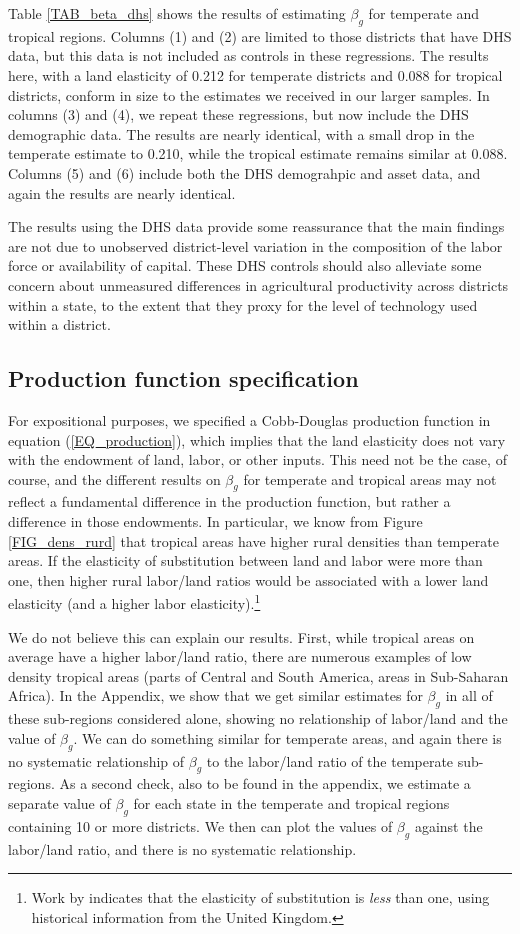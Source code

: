 \documentclass[11pt]{article}
\begin{document}
Table \ref{TAB_beta_dhs} shows the results of estimating $\beta_g$ for temperate and tropical regions. Columns (1) and (2) are limited to those districts that have DHS data, but this data is not included as controls in these regressions. The results here, with a land elasticity of 0.212 for temperate districts and 0.088 for tropical districts, conform in size to the estimates we received in our larger samples. In columns (3) and (4), we repeat these regressions, but now include the DHS demographic data. The results are nearly identical, with a small drop in the temperate estimate to 0.210, while the tropical estimate remains similar at 0.088. Columns (5) and (6) include both the DHS demograhpic and asset data, and again the results are nearly identical. 

The results using the DHS data provide some reassurance that the main findings are not due to unobserved district-level variation in the composition of the labor force or availability of capital. These DHS controls should also alleviate some concern about unmeasured differences in agricultural productivity across districts within a state, to the extent that they proxy for the level of technology used within a district.

\subsection{Production function specification}
For expositional purposes, we specified a Cobb-Douglas production function in equation (\ref{EQ_production}), which implies that the land elasticity does not vary with the endowment of land, labor, or other inputs. This need not be the case, of course, and the different results on $\beta_g$ for temperate and tropical areas may not reflect a fundamental difference in the production function, but rather a difference in those endowments. In particular, we know from Figure \ref{FIG_dens_rurd} that tropical areas have higher rural densities than temperate areas. If the elasticity of substitution between land and labor were more than one, then higher rural labor/land ratios would be associated with a lower land elasticity (and a higher labor elasticity).\footnote{Work by \citet{wilde2012} indicates that the elasticity of substitution is \textit{less} than one, using historical information from the United Kingdom.}

We do not believe this can explain our results. First, while tropical areas on average have a higher labor/land ratio, there are numerous examples of low density tropical areas (parts of Central and South America, areas in Sub-Saharan Africa). In the Appendix, we show that we get similar estimates for $\beta_g$ in all of these sub-regions considered alone, showing no relationship of labor/land and the value of $\beta_g$. We can do something similar for temperate areas, and again there is no systematic relationship of $\beta_g$ to the labor/land ratio of the temperate sub-regions. As a second check, also to be found in the appendix, we estimate a separate value of $\beta_g$ for each state in the temperate and tropical regions containing 10 or more districts. We then can plot the values of $\beta_g$ against the labor/land ratio, and there is no systematic relationship. 
\end{document}
